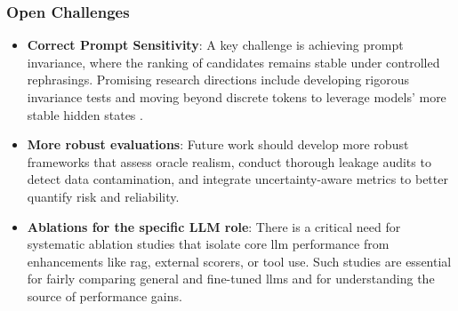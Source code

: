 \subsubsection{Open Challenges}

\begin{itemize}
    \item \textbf{Correct Prompt Sensitivity}: A key challenge is achieving prompt invariance, where the ranking of candidates remains stable under controlled rephrasings. Promising research directions include developing rigorous invariance tests and moving beyond discrete tokens to leverage models' more stable hidden states \autocite{rankovic2025gollum0}.
    \item \textbf{More robust evaluations}: Future work should develop more robust frameworks that assess oracle realism, conduct thorough leakage audits to detect data contamination, and integrate uncertainty-aware metrics to better quantify risk and reliability.
    \item \textbf{Ablations for the specific LLM role}: There is a critical need for systematic ablation studies that isolate core \gls{llm} performance from enhancements like \gls{rag}, external scorers, or tool use. Such studies are essential for fairly comparing general and fine-tuned \glspl{llm} and for understanding the source of performance gains.
\end{itemize}